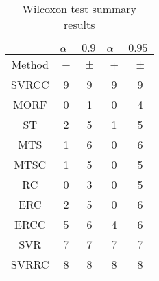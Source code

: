 \documentclass[a4paper,10pt]{article}
\begin{document}
\begin{table}[!htp]
\centering\scriptsize
\begin{tabular}{
|c|c|c|c|c|}
\hline
&\multicolumn{2}{c|}{$\alpha=0.9$} & \multicolumn{2}{c|}{$\alpha=0.95$}\\\hline
Method & + & $\pm$ & + & $\pm$ \\
\hline
SVRCC & 9 & 9 & 9 & 9\\
\hline
MORF & 0 & 1 & 0 & 4\\
\hline
ST & 2 & 5 & 1 & 5\\
\hline
MTS & 1 & 6 & 0 & 6\\
\hline
MTSC & 1 & 5 & 0 & 5\\
\hline
RC & 0 & 3 & 0 & 5\\
\hline
ERC & 2 & 5 & 0 & 6\\
\hline
ERCC & 5 & 6 & 4 & 6\\
\hline
SVR & 7 & 7 & 7 & 7\\
\hline
SVRRC & 8 & 8 & 8 & 8\\
\hline

\end{tabular}
\caption{Wilcoxon test summary results}

\end{table}

 \clearpage 
\end{document}
